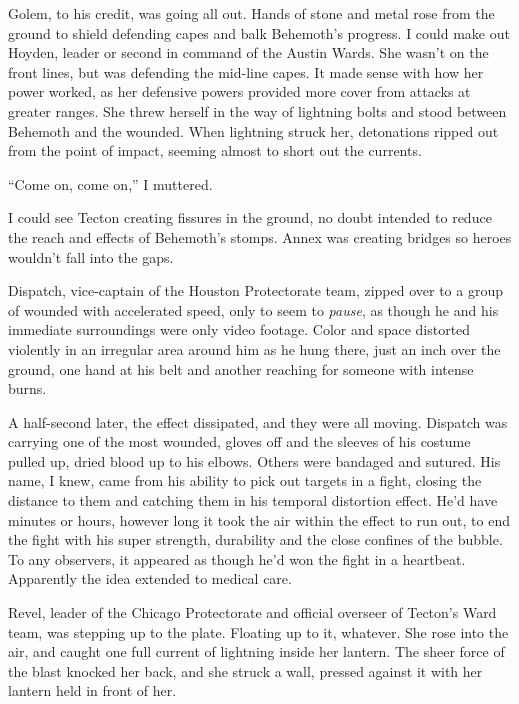 Golem, to his credit, was going all out.  Hands of stone and metal rose from the ground to shield defending capes and balk Behemoth's progress.  I could make out Hoyden, leader or second in command of the Austin Wards.  She wasn't on the front lines, but was defending the mid-line capes.  It made sense with how her power worked, as her defensive powers provided more cover from attacks at greater ranges.  She threw herself in the way of lightning bolts and stood between Behemoth and the wounded.  When lightning struck her, detonations ripped out from the point of impact, seeming almost to short out the currents.



``Come on, come on,'' I muttered.



I could see Tecton creating fissures in the ground, no doubt intended to reduce the reach and effects of Behemoth's stomps.  Annex was creating bridges so heroes wouldn't fall into the gaps.



Dispatch, vice-captain of the Houston Protectorate team, zipped over to a group of wounded with accelerated speed, only to seem to \emph{pause}, as though he and his immediate surroundings were only video footage.  Color and space distorted violently in an irregular area around him as he hung there, just an inch over the ground, one hand at his belt and another reaching for someone with intense burns.



A half-second later, the effect dissipated, and they were all moving.  Dispatch was carrying one of the most wounded, gloves off and the sleeves of his costume pulled up, dried blood up to his elbows.  Others were bandaged and sutured.  His name, I knew, came from his ability to pick out targets in a fight, closing the distance to them and catching them in his temporal distortion effect.  He'd have minutes or hours, however long it took the air within the effect to run out, to end the fight with his super strength, durability and the close confines of the bubble.  To any observers, it appeared as though he'd won the fight in a heartbeat.  Apparently the idea extended to medical care.



Revel, leader of the Chicago Protectorate and official overseer of Tecton's Ward team, was stepping up to the plate.  Floating up to it, whatever.  She rose into the air, and caught one full current of lightning inside her lantern.  The sheer force of the blast knocked her back, and she struck a wall, pressed against it with her lantern held in front of her.




